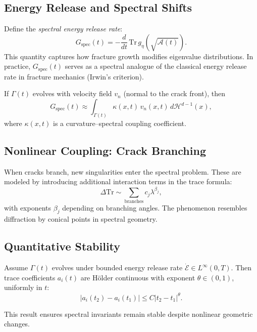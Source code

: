 \subsection{Energy Release and Spectral Shifts}

Define the \emph{spectral energy release rate}:
\[
G_{\text{spec}}(t) =
-\frac{d}{dt}\,\mathrm{Tr}\, g_\eta(\sqrt{\mathcal{A}(t)}).
\]
This quantity captures how fracture growth modifies eigenvalue
distributions.  
In practice, $G_{\text{spec}}(t)$ serves as a spectral analogue of the
classical energy release rate in fracture mechanics (Irwin’s criterion).

\begin{proposition}
\label{prop:spectral-release}
If $\Gamma(t)$ evolves with velocity field $v_n$ (normal to the crack
front), then
\[
G_{\text{spec}}(t) \approx \int_{\Gamma(t)} \kappa(x,t) \, v_n(x,t)\, d\mathcal{H}^{d-1}(x),
\]
where $\kappa(x,t)$ is a curvature–spectral coupling coefficient.
\end{proposition}

\subsection{Nonlinear Coupling: Crack Branching}

When cracks branch, new singularities enter the spectral problem.
These are modeled by introducing additional interaction terms in the
trace formula:
\[
\Delta \mathrm{Tr} \sim
\sum_{\text{branches}} c_j \lambda^{\beta_j},
\]
with exponents $\beta_j$ depending on branching angles.  
The phenomenon resembles diffraction by conical points in spectral
geometry.

\subsection{Quantitative Stability}

\begin{theorem}
\label{thm:holder-stability}
Assume $\Gamma(t)$ evolves under bounded energy release rate
$\dot{\mathcal{E}} \in L^\infty(0,T)$.  
Then trace coefficients $a_i(t)$ are Hölder continuous with exponent
$\theta \in (0,1)$, uniformly in $t$:
\[
|a_i(t_2)-a_i(t_1)| \leq C |t_2-t_1|^\theta.
\]
\end{theorem}

This result ensures spectral invariants remain stable despite nonlinear
geometric changes.

